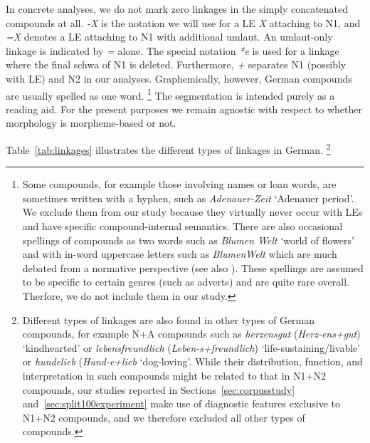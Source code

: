 In concrete analyses, we do not mark zero linkages in the simply concatenated compounds at all.
\textit{-X} is the notation we will use for a LE \textit{X} attaching to N1, and \textit{=X} denotes a LE attaching to N1 with additional umlaut.
An umlaut-only linkage is indicated by \textit{=} alone.
The special notation \textit{*e} is used for a linkage where the final schwa of N1 is deleted.
Furthermore, \textit{+} separates N1 (possibly with LE) and N2 in our analyses.
Graphemically, however, German compounds are usually spelled as one word.%
\footnote{Some compounds, for example those involving names or loan words, are sometimes written with a hyphen, such as \textit{Adenauer-Zeit} `Adenauer period'.
We exclude them from our study because they virtually never occur with LEs and have specific compound-internal semantics.
There are also occasional spellings of compounds as two words such as \textit{Blumen Welt} `world of flowers' and with in-word uppercase letters such as \textit{BlumenWelt} which are much debated from a normative perspective (see also \citealt{Scherer2012}).
These spellings are assumed to be specific to certain genres (such as adverts) and are quite rare overall.
Therfore, we do not include them in our study.}
The segmentation is intended purely as a reading aid.
For the present purposes we remain agnostic with respect to whether morphology is morpheme-based or not.

Table~\ref{tab:linkages} illustrates the different types of linkages in German.%
\footnote{Different types of linkages are also found in other types of German compounds, for example N+A compounds such as \textit{herzensgut} (\textit{Herz-ens+gut}) `kindhearted' or \textit{lebensfreundlich} (\textit{Leben-s+freundlich}) `life-sustaining\slash livable' or \textit{hundelieb} (\textit{Hund-e+lieb} `dog-loving'.
While their distribution, function, and interpretation in such compounds might be related to that in N1+N2 compounds, our studies reported in Sections~\ref{sec:corpusstudy} and~\ref{sec:split100experiment} make use of diagnostic features exclusive to N1+N2 compounds, and we therefore excluded all other types of compounds.}

